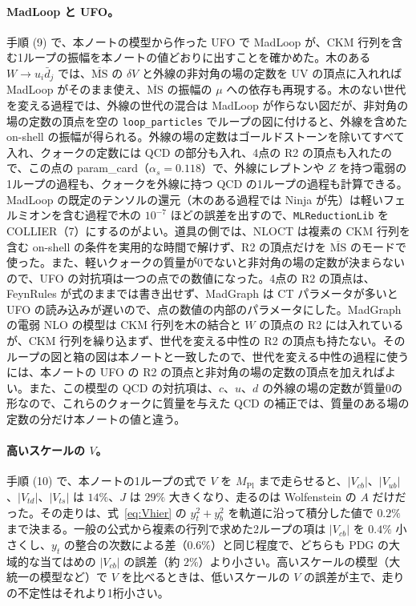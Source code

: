 \documentclass[a4paper,10pt]{ltjsarticle}
\newcommand{\MSbar}{\overline{\mathrm{MS}}}
\begin{document}
\paragraph{MadLoop と UFO。}手順 (9) で、本ノートの模型から作った UFO で MadLoop が、CKM 行列を含む1ループの振幅を本ノートの値どおりに出すことを確かめた。木のある $W\to u_i\bar d_j$ では、$\MSbar$ の $\delta V$ と外線の非対角の場の定数を UV の頂点に入れれば MadLoop がそのまま使え、$\MSbar$ の振幅の $\mu$ への依存も再現する。木のない世代を変える過程では、外線の世代の混合は MadLoop が作らない図だが、非対角の場の定数の頂点を空の \texttt{loop\_particles} でループの図に付けると、外線を含めた on-shell の振幅が得られる。外線の場の定数はゴールドストーンを除いてすべて入れ、クォークの定数には QCD の部分も入れ、4点の R2 の頂点も入れたので、この点の param\_card（$\alpha_s=0.118$）で、外線にレプトンや $Z$ を持つ電弱の1ループの過程も、クォークを外線に持つ QCD の1ループの過程も計算できる。MadLoop の既定のテンソルの還元（木のある過程では Ninja が先）は軽いフェルミオンを含む過程で木の $10^{-7}$ ほどの誤差を出すので、\texttt{MLReductionLib} を COLLIER（7）にするのがよい。道具の側では、NLOCT は複素の CKM 行列を含む on-shell の条件を実用的な時間で解けず、R2 の頂点だけを $\MSbar$ のモードで使った。また、軽いクォークの質量が0でないと非対角の場の定数が決まらないので、UFO の対抗項は一つの点での数値になった。4点の R2 の頂点は、FeynRules が式のままでは書き出せず、MadGraph は CT パラメータが多いと UFO の読み込みが遅いので、点の数値の内部のパラメータにした。MadGraph の電弱 NLO の模型は CKM 行列を木の結合と $W$ の頂点の R2 には入れているが、CKM 行列を繰り込まず、世代を変える中性の R2 の頂点も持たない。そのループの図と箱の図は本ノートと一致したので、世代を変える中性の過程に使うには、本ノートの UFO の R2 の頂点と非対角の場の定数の頂点を加えればよい。また、この模型の QCD の対抗項は、$c$、$u$、$d$ の外線の場の定数が質量0の形なので、これらのクォークに質量を与えた QCD の補正では、質量のある場の定数の分だけ本ノートの値と違う。

\paragraph{高いスケールの $V$。}手順 (10) で、本ノートの1ループの式で $V$ を $M_{\mathrm{Pl}}$ まで走らせると、$|V_{cb}|$、$|V_{ub}|$、$|V_{td}|$、$|V_{ts}|$ は $14\%$、$J$ は $29\%$ 大きくなり、走るのは Wolfenstein の $A$ だけだった。その走りは、式~\eqref{eq:Vhier} の $y_t^2+y_b^2$ を軌道に沿って積分した値で $0.2\%$ まで決まる。一般の公式から複素の行列で求めた2ループの項は $|V_{cb}|$ を $0.4\%$ 小さくし、$y_t$ の整合の次数による差（$0.6\%$）と同じ程度で、どちらも PDG の大域的な当てはめの $|V_{cb}|$ の誤差（約 $2\%$）より小さい。高いスケールの模型（大統一の模型など）で $V$ を比べるときは、低いスケールの $V$ の誤差が主で、走りの不定性はそれより1桁小さい。
\end{document}

